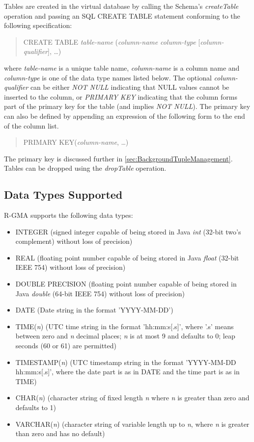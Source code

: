 Tables are created in the virtual database by calling the Schema's
\textit{createTable} operation and passing an SQL CREATE TABLE statement
conforming to the following specification:

\begin{quote}CREATE TABLE \textit{table-name} (\textit{column-name}
\textit{column-type} [\textit{column-qualifier}], \ldots)
\end{quote}

where \textit{table-name} is a unique table name, \textit{column-name}
is a column name and \textit{column-type} is one of the data type
names listed below. The optional \textit{column-qualifier} can be
either \textit{NOT NULL} indicating that NULL values cannot be
inserted to the column, or \textit{PRIMARY KEY} indicating that the
column forms part of the primary key for the table (and implies
\textit{NOT NULL}). The primary key can also be defined by appending
an expression of the following form to the end of the column list.

\begin{quote}
PRIMARY KEY(\textit{column-name}, \ldots)
\end{quote}

The primary key is discussed further in
\ref{sec:BackgroundTupleManagement}.  Tables can be dropped using the
\textit{dropTable} operation.

\subsection{Data Types Supported}\label{sec:SQLDataTypes}

R-GMA supports the following data types:

\begin{itemize}
\item INTEGER (signed integer capable of being stored in Java \textit{int} (32-bit two's complement) without loss of precision)
\item REAL (floating point number capable of being stored in Java \textit{float} (32-bit IEEE 754) without loss of precision)
\item DOUBLE PRECISION (floating point number capable of being stored in Java \textit{double} (64-bit IEEE 754) without loss of precision)
\item DATE (Date string in the format 'YYYY-MM-DD')
\item TIME(\textit{n}) (UTC time string in the format 'hh:mm:s[.s]', where '.s' means between zero and \textit{n} decimal places; \textit{n} is at most 9 and defaults to 0; leap seconds (60 or 61) are permitted)
\item TIMESTAMP(\textit{n}) (UTC timestamp string in the format 'YYYY-MM-DD hh:mm:s[.s]', where the date part is as in DATE and the time part is as in TIME)
\item CHAR(\textit{n}) (character string of fixed length \textit{n} where \textit{n} is greater than zero and defaults to 1)
\item VARCHAR(\textit{n}) (character string of variable length up to
\textit{n}, where \textit{n} is greater than zero and has no default)
\end{itemize}

